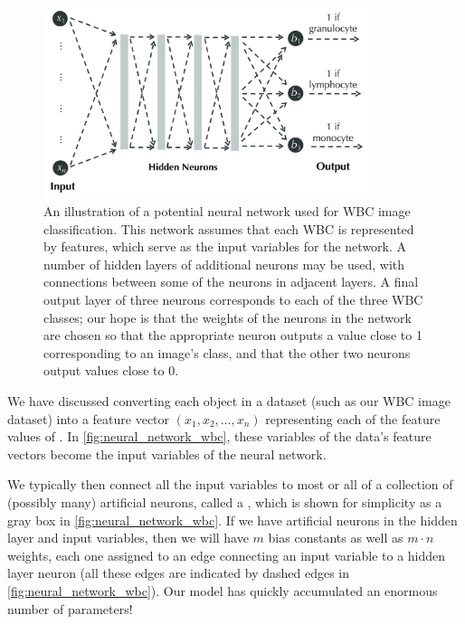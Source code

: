 \begin{figure}[h]
\centering
\mySfFamily
\includegraphics[width = 0.85\textwidth]{../images_CMYK/neural_network_wbc}
\caption{An illustration of a potential neural network used for WBC image classification. This network assumes that each WBC is represented by  features, which serve as the input variables for the network. A number of hidden layers of additional neurons may be used, with connections between some of the neurons in adjacent layers. A final output layer of three neurons corresponds to each of the three WBC classes; our hope is that the weights of the neurons in the network are chosen so that the appropriate neuron outputs a value close to 1 corresponding to an image's class, and that the other two neurons output values close to 0.}
\label{fig:neural_network_wbc}
\end{figure}

We have discussed converting each object  in a dataset (such as our WBC image dataset) into a feature vector $(x_1, x_2, \ldots, x_n)$ representing each of the  feature values of . In \autoref{fig:neural_network_wbc}, these  variables of the data's feature vectors become the  input variables of the neural network.

We typically then connect all the input variables to most or all of a collection of (possibly many) artificial neurons, called a , which is shown for simplicity as a gray box in \autoref{fig:neural_network_wbc}. If we have  artificial neurons in the hidden layer and  input variables, then we will have $m$ bias constants as well as $m \cdot n$ weights, each one assigned to an edge connecting an input variable to a hidden layer neuron (all these edges are indicated by dashed edges in \autoref{fig:neural_network_wbc}). Our model has quickly accumulated an enormous number of parameters!


